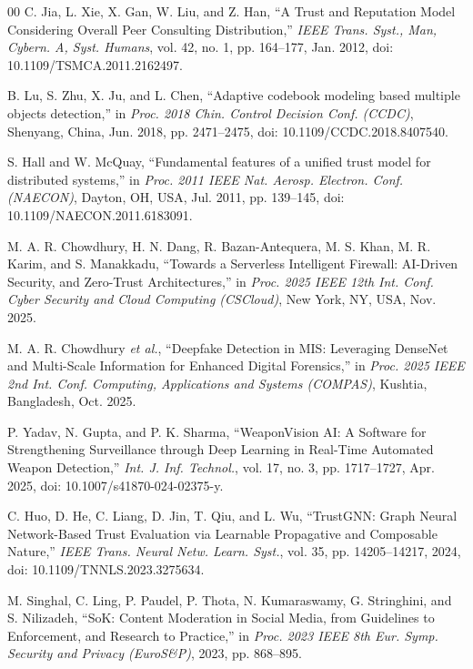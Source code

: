 \documentclass[conference]{IEEEtran}
\begin{document}
\begin{thebibliography}{00}
 C. Jia, L. Xie, X. Gan, W. Liu, and Z. Han, ``A Trust and Reputation Model Considering Overall Peer Consulting Distribution,'' \emph{IEEE Trans. Syst., Man, Cybern. A, Syst. Humans}, vol. 42, no. 1, pp. 164--177, Jan. 2012, doi: 10.1109/TSMCA.2011.2162497.

 B. Lu, S. Zhu, X. Ju, and L. Chen, ``Adaptive codebook modeling based multiple objects detection,'' in \emph{Proc. 2018 Chin. Control Decision Conf. (CCDC)}, Shenyang, China, Jun. 2018, pp. 2471--2475, doi: 10.1109/CCDC.2018.8407540.

 S. Hall and W. McQuay, ``Fundamental features of a unified trust model for distributed systems,'' in \emph{Proc. 2011 IEEE Nat. Aerosp. Electron. Conf. (NAECON)}, Dayton, OH, USA, Jul. 2011, pp. 139--145, doi: 10.1109/NAECON.2011.6183091.

 M. A. R. Chowdhury, H. N. Dang, R. Bazan-Antequera, M. S. Khan, M. R. Karim, and S. Manakkadu, ``Towards a Serverless Intelligent Firewall: AI-Driven Security, and Zero-Trust Architectures,'' in \emph{Proc. 2025 IEEE 12th Int. Conf. Cyber Security and Cloud Computing (CSCloud)}, New York, NY, USA, Nov. 2025.

 M. A. R. Chowdhury \emph{et al.}, ``Deepfake Detection in MIS: Leveraging DenseNet and Multi-Scale Information for Enhanced Digital Forensics,'' in \emph{Proc. 2025 IEEE 2nd Int. Conf. Computing, Applications and Systems (COMPAS)}, Kushtia, Bangladesh, Oct. 2025.

 P. Yadav, N. Gupta, and P. K. Sharma, ``WeaponVision AI: A Software for Strengthening Surveillance through Deep Learning in Real-Time Automated Weapon Detection,'' \emph{Int. J. Inf. Technol.}, vol. 17, no. 3, pp. 1717--1727, Apr. 2025, doi: 10.1007/s41870-024-02375-y.

 C. Huo, D. He, C. Liang, D. Jin, T. Qiu, and L. Wu, ``TrustGNN: Graph Neural Network-Based Trust Evaluation via Learnable Propagative and Composable Nature,'' \emph{IEEE Trans. Neural Netw. Learn. Syst.}, vol. 35, pp. 14205--14217, 2024, doi: 10.1109/TNNLS.2023.3275634.

 M. Singhal, C. Ling, P. Paudel, P. Thota, N. Kumaraswamy, G. Stringhini, and S. Nilizadeh, ``SoK: Content Moderation in Social Media, from Guidelines to Enforcement, and Research to Practice,'' in \emph{Proc. 2023 IEEE 8th Eur. Symp. Security and Privacy (EuroS\&P)}, 2023, pp. 868--895.

\end{thebibliography}
\end{document}
